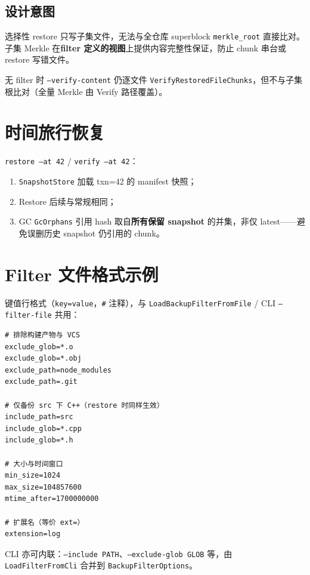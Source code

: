 \subsection{设计意图}

选择性 restore 只写子集文件，无法与全仓库 superblock \texttt{merkle\_root} 直接比对。子集 Merkle 在\textbf{filter 定义的视图}上提供内容完整性保证，防止 chunk 串台或 restore 写错文件。

无 filter 时 \texttt{--verify-content} 仍逐文件 \texttt{VerifyRestoredFileChunks}，但不与子集根比对（全量 Merkle 由 Verify 路径覆盖）。

\section{时间旅行恢复}

\texttt{restore --at 42} / \texttt{verify --at 42}：
\begin{enumerate}
  \item \texttt{SnapshotStore} 加载 txn=42 的 manifest 快照；
  \item Restore 后续与常规相同；
  \item GC \texttt{GcOrphans} 引用 hash 取自\textbf{所有保留 snapshot} 的并集，非仅 latest——避免误删历史 snapshot 仍引用的 chunk。
\end{enumerate}

\section{Filter 文件格式示例}

键值行格式（\texttt{key=value}，\texttt{\#} 注释），与 \texttt{LoadBackupFilterFromFile} / CLI \texttt{--filter-file} 共用：

\begin{lstlisting}[caption={filter.conf 示例},label={lst:filter-example}]
# 排除构建产物与 VCS
exclude_glob=*.o
exclude_glob=*.obj
exclude_path=node_modules
exclude_path=.git

# 仅备份 src 下 C++（restore 时同样生效）
include_path=src
include_glob=*.cpp
include_glob=*.h

# 大小与时间窗口
min_size=1024
max_size=104857600
mtime_after=1700000000

# 扩展名（等价 ext=）
extension=log
\end{lstlisting}

CLI 亦可内联：\texttt{--include PATH}、\texttt{--exclude-glob GLOB} 等，由 \texttt{LoadFilterFromCli} 合并到 \texttt{BackupFilterOptions}。

